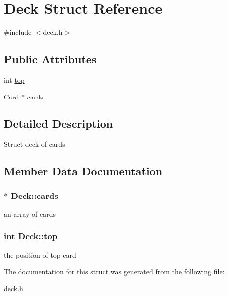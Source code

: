 \hypertarget{structDeck}{\section{Deck Struct Reference}
\label{structDeck}
}


{\ttfamily \#include $<$deck.\+h$>$}

\subsection*{Public Attributes}
\begin{DoxyCompactItemize}
\item 
int \hyperlink{structDeck_a9b480280ce1366ad9f578876e897c858}{top}
\item 
\hyperlink{structCard}{Card} $\ast$ \hyperlink{structDeck_aa5c2498afeda699034fd5feb50234092}{cards}
\end{DoxyCompactItemize}


\subsection{Detailed Description}
Struct deck of cards 

\subsection{Member Data Documentation}
\hypertarget{structDeck_aa5c2498afeda699034fd5feb50234092}{
\subsubsection[{cards}]{$\ast$ Deck\+::cards}}\label{structDeck_aa5c2498afeda699034fd5feb50234092}
an array of cards \hypertarget{structDeck_a9b480280ce1366ad9f578876e897c858}{
\subsubsection[{top}]{\setlength{\rightskip}{0pt plus 5cm}int Deck\+::top}}\label{structDeck_a9b480280ce1366ad9f578876e897c858}
the position of top card 

The documentation for this struct was generated from the following file\+:\begin{DoxyCompactItemize}
\item 
\hyperlink{deck_8h}{deck.\+h}\end{DoxyCompactItemize}
